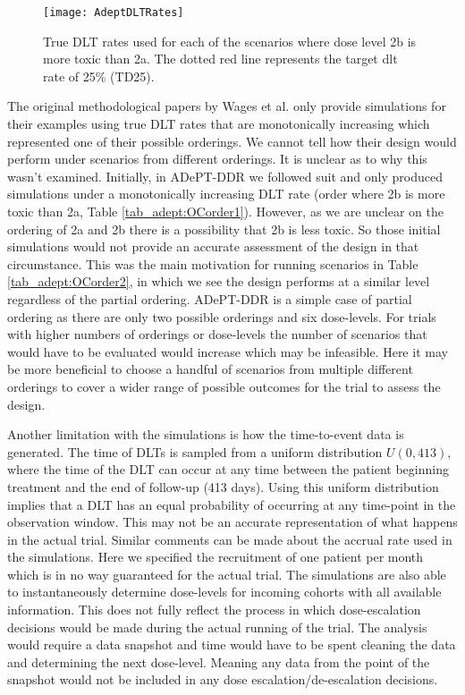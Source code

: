 \begin{figure}[h!]
	\centering
	\caption[Illustration of true DLT rates used in simulations.]{True DLT rates used for each of the scenarios where dose level 2b is more toxic than 2a. The dotted red line represents the target dlt rate of 25\% (TD25).}
	\label{fig_adept:dlt_rates}
	\texttt{[image: AdeptDLTRates]}
\end{figure}
 
The original methodological papers by Wages et al. \cite{wagesUsingTimetoeventContinual2013,wagesContinualReassessmentMethod2011} only provide simulations for their examples using true DLT rates that are monotonically increasing which represented one of their possible orderings. We cannot tell how their design would perform under scenarios from different orderings. It is unclear as to why this wasn't examined. Initially, in ADePT-DDR we followed suit and only produced simulations under a monotonically increasing DLT rate (order where 2b is more toxic than 2a, Table \ref{tab_adept:OCorder1}). However, as we are unclear on the ordering of 2a and 2b there is a possibility that 2b is less toxic. So those initial simulations would not provide an accurate assessment of the design in that circumstance. This was the main motivation for running scenarios in Table \ref{tab_adept:OCorder2}, in which we see the design performs at a similar level regardless of the partial ordering. ADePT-DDR is a simple case of partial ordering as there are only two possible orderings and six dose-levels. For trials with higher numbers of orderings or dose-levels the number of scenarios that would have to be evaluated would increase which may be infeasible. Here it may be more beneficial to choose a handful of scenarios from multiple different orderings to cover a wider range of possible outcomes for the trial to assess the design. 

Another limitation with the simulations is how the time-to-event data is generated. The time of DLTs is sampled from a uniform distribution $U(0, 413)$, where the time of the DLT can occur at any time between the patient beginning treatment and the end of follow-up (413 days). Using this uniform distribution implies that a DLT has an equal probability of occurring at any time-point in the observation window. This may not be an accurate representation of what happens in the actual trial. Similar comments can be made about the accrual rate used in the simulations. Here we specified the recruitment of one patient per month which is in no way guaranteed for the actual trial. The simulations are also able to instantaneously determine dose-levels for incoming cohorts with all available information. This does not fully reflect the process in which dose-escalation decisions would be made during the actual running of the trial. The analysis would require a data snapshot and time would have to be spent cleaning the data and determining the next dose-level. Meaning any data from the point of the snapshot would not be included in any dose escalation/de-escalation decisions. 

